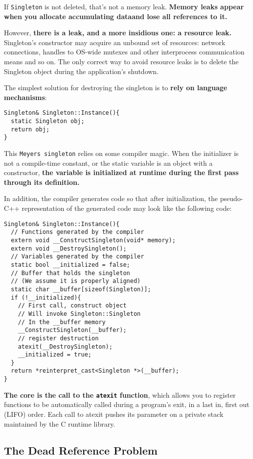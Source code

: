 If \texttt{Singleton} is not deleted, that's not a memory
leak. \textbf{Memory leaks appear when you allocate accumulating
dataand lose all references to it.  } 

However, \textbf{there is a leak, and a more insidious one: a resource
leak.}  Singleton's constructor may acquire an unbound set of
resources: network connections, handles to OS-wide mutexes and other
interprocess communication means and so on. The only correct way to
avoid resource leaks is to delete the Singleton object during the
application's shutdown.

The simplest solution for destroying the singleton is to \textbf{rely on
  language mechanisms}:
\begin{verbatim}
Singleton& Singleton::Instance(){
  static Singleton obj;
  return obj;
}
\end{verbatim}

This \texttt{Meyers singleton} relies on some compiler magic. When the
initializer is not a compile-time constant, or the static variable is
an object with a constructor,\textbf{ the variable is initialized at runtime
  during the first pass through its definition.}

In addition, the compiler generates code so that after initialization,
the pseudo-C++ representation of the generated code may look like the
following code:
\begin{verbatim}
Singleton& Singleton::Instance(){
  // Functions generated by the compiler
  extern void __ConstructSingleton(void* memory);
  extern void __DestroySingleton();
  // Variables generated by the compiler
  static bool __initialized = false;
  // Buffer that holds the singleton
  // (We assume it is properly aligned)
  static char __buffer[sizeof(Singleton)];
  if (!__initialized){
    // First call, construct object
    // Will invoke Singleton::Singleton
    // In the __buffer memory
    __ConstructSingleton(__buffer);
    // register destruction
    atexit(__DestroySingleton);
    __initialized = true;
  }
  return *reinterpret_cast<Singleton *>(__buffer);
}
\end{verbatim}

\textbf{The core is the call to the \texttt{atexit} function}, which
allows you to register functions to be automatically called during a
program's exit, in a last in, first out (LIFO) order. Each call to
atexit pushes its parameter on a private stack maintained by the C
runtime library.

\subsection{The Dead Reference Problem}

